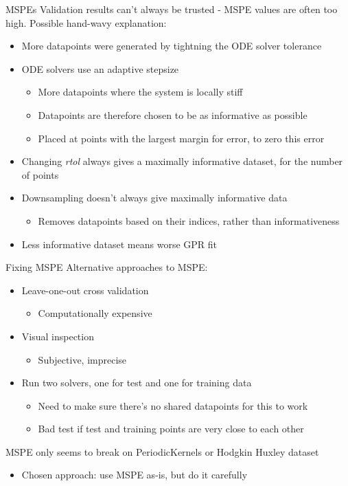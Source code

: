 \documentclass[presentation]{beamer}
\begin{document}
\begin{frame}[label={sec:orgbc91982}]{MSPEs}
Validation results can't always be trusted - MSPE values are often too high.
Possible hand-wavy explanation:
\begin{itemize}[<+->]
\item More datapoints were generated by tightning the ODE solver tolerance
\item ODE solvers use an adaptive stepsize
\begin{itemize}
\item More datapoints where the system is locally stiff
\item Datapoints are therefore chosen to be as informative as possible
\item Placed at points with the largest margin for error, to zero this error
\end{itemize}
\item Changing \emph{rtol} always gives a maximally informative dataset, for the number of points
\item Downsampling doesn't always give maximally informative data
\begin{itemize}
\item Removes datapoints based on their indices, rather than informativeness
\end{itemize}
\item Less informative dataset means worse GPR fit
\end{itemize}
\end{frame}

\begin{frame}[label={sec:org6d38b61}]{Fixing MSPE}
Alternative approaches to MSPE:
\begin{itemize}
\item Leave-one-out cross validation 
\begin{itemize}
\item Computationally expensive
\end{itemize}
\item Visual inspection
\begin{itemize}
\item Subjective, imprecise
\end{itemize}
\item Run two solvers, one for test and one for training data
\begin{itemize}
\item Need to make sure there's no shared datapoints for this to work
\item Bad test if test and training points are very close to each other
\end{itemize}
\end{itemize}
\vfill
MSPE only seems to break on PeriodicKernels or Hodgkin Huxley dataset
\begin{itemize}
\item Chosen approach: use MSPE as-is, but do it carefully
\end{itemize}
\end{frame}
\end{document}
